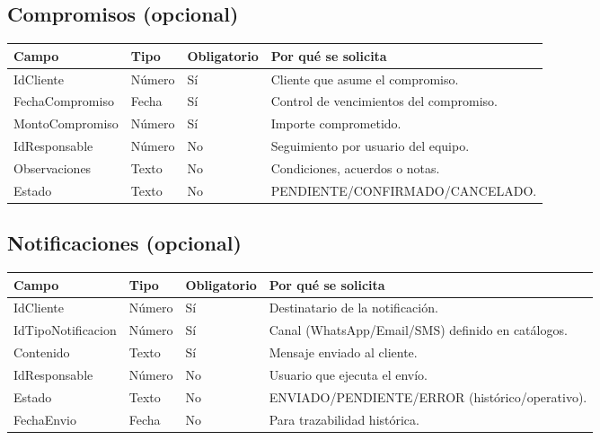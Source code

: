 \documentclass[11pt,a4paper]{article}
\begin{document}
\subsection{Compromisos (opcional)}
\begin{longtable}{|p{3.2cm}|p{2.2cm}|p{2.2cm}|p{6.0cm}|}
\hline
\textbf{Campo} & \textbf{Tipo} & \textbf{Obligatorio} & \textbf{Por qué se solicita} \\
\hline
IdCliente & Número & Sí & Cliente que asume el compromiso. \\
FechaCompromiso & Fecha & Sí & Control de vencimientos del compromiso. \\
MontoCompromiso & Número & Sí & Importe comprometido. \\
IdResponsable & Número & No & Seguimiento por usuario del equipo. \\
Observaciones & Texto & No & Condiciones, acuerdos o notas. \\
Estado & Texto & No & PENDIENTE/CONFIRMADO/CANCELADO. \\
\hline
\end{longtable}

\subsection{Notificaciones (opcional)}
\begin{longtable}{|p{3.2cm}|p{2.2cm}|p{2.2cm}|p{6.0cm}|}
\hline
\textbf{Campo} & \textbf{Tipo} & \textbf{Obligatorio} & \textbf{Por qué se solicita} \\
\hline
IdCliente & Número & Sí & Destinatario de la notificación. \\
IdTipoNotificacion & Número & Sí & Canal (WhatsApp/Email/SMS) definido en catálogos. \\
Contenido & Texto & Sí & Mensaje enviado al cliente. \\
IdResponsable & Número & No & Usuario que ejecuta el envío. \\
Estado & Texto & No & ENVIADO/PENDIENTE/ERROR (histórico/operativo). \\
FechaEnvio & Fecha & No & Para trazabilidad histórica. \\
\hline
\end{longtable}
\end{document}
